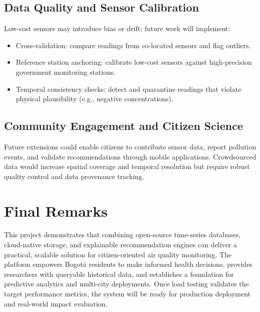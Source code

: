 \subsection{Data Quality and Sensor Calibration}
Low-cost sensors may introduce bias or drift; future work will implement:
\begin{itemize}
    \item Cross-validation: compare readings from co-located sensors and flag outliers.
    \item Reference station anchoring: calibrate low-cost sensors against high-precision government monitoring stations.
    \item Temporal consistency checks: detect and quarantine readings that violate physical plausibility (e.g., negative concentrations).
\end{itemize}

\subsection{Community Engagement and Citizen Science}
Future extensions could enable citizens to contribute sensor data, report pollution events, and validate recommendations through mobile applications. Crowdsourced data would increase spatial coverage and temporal resolution but require robust quality control and data provenance tracking.

\section{Final Remarks}
\label{sec:final_remarks}

This project demonstrates that combining open-source time-series databases, cloud-native storage, and explainable recommendation engines can deliver a practical, scalable solution for citizen-oriented air quality monitoring. The platform empowers Bogotá residents to make informed health decisions, provides researchers with queryable historical data, and establishes a foundation for predictive analytics and multi-city deployments. Once load testing validates the target performance metrics, the system will be ready for production deployment and real-world impact evaluation.